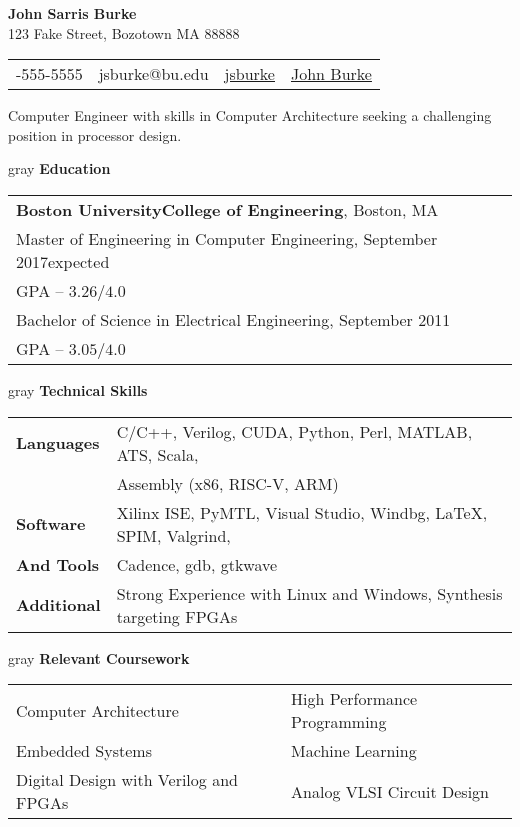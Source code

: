 \documentclass[10.5pt,letterpaper]{article}
\makeatletter
\newcommand{\org}[1]{\textbf{#1}}
\newcommand{\vertspace}{\vspace{1.2mm}}
\newcommand{\horzindent}{\hspace{3mm}}
\newcommand{\latex}{\LaTeX\space}
\newcommand{\tablewidth}{.9\linewidth}
\newcommand{\name}{John Sarris Burke}
\newcommand{\infoshift}{\hspace{15.5mm}}
\newcommand{\address}{123 Fake Street, Bozotown MA 88888}
\newcommand{\phone}{555-555-5555}
\newcommand{\email}{jsburke@bu.edu}
\newcommand{\github}{\href{https://github.com/jsburke/}{jsburke}}
\newcommand{\linkedin}{\href{https://www.linkedin.com/in/john-burke-51325935/}{John Burke}}
\newcommand{\undergradmajor}{Electrical Engineering}
\newcommand{\undergradend}{September 2011}
\newcommand{\grad}{Boston University}
\newcommand{\gradschool}{College of Engineering}
\newcommand{\gradmajor}{Computer Engineering}
\newcommand{\gradend}{September 2017}
\newcommand{\objective}{Computer Engineer with skills in Computer Architecture seeking a challenging position in processor design.}
\newlength\myheight
\newlength\mydepth
\newcommand*\inlineicon[1]{%
  \settototalheight\myheight{Xygp}%
  \settodepth\mydepth{Xygp}%
  \raisebox{-\mydepth}{\texttt{[image: \#1]}}%
}
\newcommand{\iconemail}{\inlineicon{email-icon-2048}\space}
\newcommand{\icongithub}{\inlineicon{GitHub-Mark-120px-plus}\space}
\newcommand{\iconphone}{\inlineicon{phone-icon-black}\space}
\newcommand{\iconlinkedin}{\inlineicon{linkedin-icon-black}\space}
\makeatother
\begin{document}
	
	\begin{center}	
		\textbf{\large \name}\\
		\address\\
		\begin{tabular}{c||c||c||c}
			\infoshift \iconphone \phone & \iconemail \email & \icongithub \github & \iconlinkedin \linkedin \\
		\end{tabular}
		\newline \objective
	\end{center}

	\noindent
	\begin{heading}{gray}
		\textbf{Education}
	\end{heading}
		\begin{tabular*}{\tablewidth}{l}
			\org{\grad\space\gradschool}, Boston, MA \\
			\horzindent Master of Engineering in \gradmajor , \gradend\space expected \\
			\horzindent GPA -- $3.26 / 4.0$ \\
			\horzindent Bachelor of Science in \undergradmajor , \undergradend \\
			\horzindent GPA -- $3.05 / 4.0$ \\
		\end{tabular*}

	\noindent
	\begin{heading}{gray}
		\textbf{Technical Skills}
	\end{heading}
	\begin{tabular*}{\tablewidth}{l|l}
		\textbf{Languages} & C/C++, Verilog, CUDA, Python, Perl, MATLAB, ATS, Scala, \\
		  & Assembly (x86, RISC-V, ARM) \\ \hline %
		\textbf{Software} & Xilinx ISE, PyMTL, Visual Studio, Windbg, \latex, SPIM, Valgrind, \\
		  \textbf{And Tools}& Cadence, gdb, gtkwave\\ \hline
		\textbf{Additional} & Strong Experience with Linux and Windows, Synthesis targeting FPGAs
	\end{tabular*}

	\iffalse
	
	\vertspace
	\noindent	
	\begin{heading}{gray}
		\textbf{Relevant Coursework}
	\end{heading}
		\begin{tabular*}{\tablewidth}{@{\extracolsep{\fill}}ll}
			Computer Architecture & High Performance Programming \\
			Embedded Systems      & Machine Learning \\
			Digital Design with Verilog and FPGAs & Analog VLSI Circuit Design \\
		\end{tabular*}
		
\end{document}
